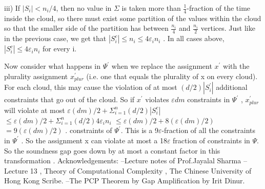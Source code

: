 \documentclass[11pt]{article}
\begin{document}
 iii) If $|S_i | < n_i /4$, then no value in $\Sigma$  is taken more than $\frac{1}{4}$-fraction of the time inside the cloud,
so there must exist some partition of the values within the cloud so that the smaller side of
the partition has between $\frac{n_i}{4}$ and  $\frac{n_i}{2}$ vertices. Just like in the previous case, we get that
$|S_{i}^{c} | \leq  n_i \leq  4\varepsilon_i n_i$ .
In all cases above, $|S_{i}^{c} | \leq  4\varepsilon_i n_i$ for every i.

Now consider what happens in $\Psi^{'}$ when we replace the assignment $x^{'}$ with the plurality assignment
$x_{plur}^{'}$ (i.e. one that equals the plurality of x on every cloud). For each cloud, this may cause the
violation of at most $(d/2)|S_{i}^{'}|$ additional constraints that go out of the cloud. So if $x^{'}$ violates $\varepsilon dm$
constraints in $\Psi^{'}$ , $x_{plur}^{'}$ will violate at most
$ \varepsilon (dm)/2 + \Sigma_{i=1}^{n} (d/2)|S_{i}^{c}|$
$ \leq \varepsilon (dm)/2 + \Sigma_{i=1}^{n} (d/2)4\varepsilon_i n_i$
$ \leq \varepsilon (dm)/2 + 8(\varepsilon (dm)/2 )$
$= 9(\varepsilon (dm)/2 )$ .
constraints of $\Psi^{'}$. This is a 9$\varepsilon $-fraction of all the constraints in $\Psi^{'}$ . So the assignment x can violate at most a 18$\varepsilon $ fraction of constraints in $\Psi $.
\newline So the soundness gap goes down by at most a constant factor in this transformation .
Acknowledgements:
\newline--Lecture notes of Prof.Jayalal Sharma
\newline--Lecture 13 , Theory of Computational Complexity , The Chinese University of Hong Kong Scribe.
\newline--The PCP Theorem by Gap Amplification by Irit Dinur.
\end{document}
